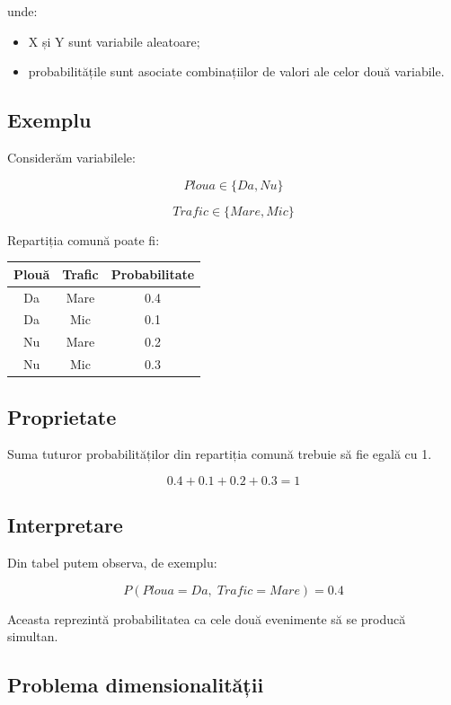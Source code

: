 \documentclass[12pt,a4paper]{article}
\begin{document}
unde:

\begin{itemize}
\item X și Y sunt variabile aleatoare;
\item probabilitățile sunt asociate combinațiilor de valori ale celor două variabile.
\end{itemize}

\subsection{Exemplu}

Considerăm variabilele:

\[
Ploua \in \{Da, Nu\}
\]

\[
Trafic \in \{Mare, Mic\}
\]

Repartiția comună poate fi:

\begin{center}
\begin{tabular}{|c|c|c|}
\hline
Plouă & Trafic & Probabilitate \\
\hline
Da & Mare & 0.4 \\
Da & Mic & 0.1 \\
Nu & Mare & 0.2 \\
Nu & Mic & 0.3 \\
\hline
\end{tabular}
\end{center}

\subsection{Proprietate}

Suma tuturor probabilităților din repartiția comună trebuie să fie egală cu 1.

\[
0.4+0.1+0.2+0.3=1
\]

\subsection{Interpretare}

Din tabel putem observa, de exemplu:

\[
P(Ploua=Da,\;Trafic=Mare)=0.4
\]

Aceasta reprezintă probabilitatea ca cele două evenimente să se producă simultan.

\subsection{Problema dimensionalității}
\end{document}
